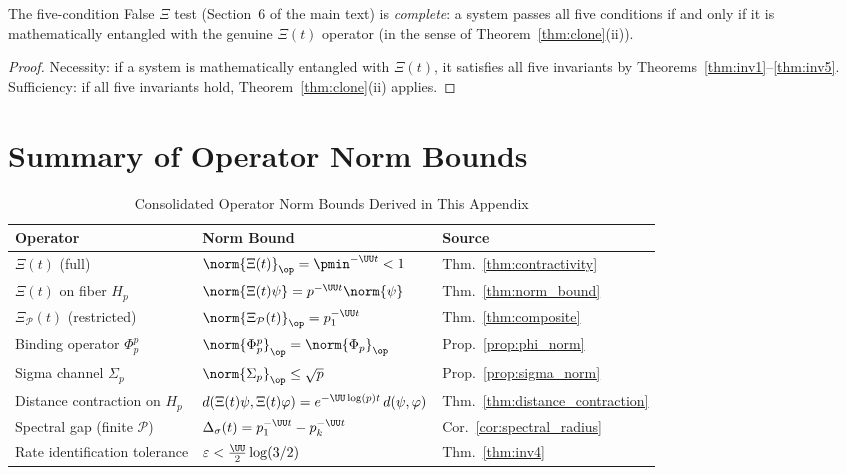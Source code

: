 \documentclass[12pt,letterpaper]{article}
\theoremstyle{definition}
\theoremstyle{remark}
\begin{document}
\begin{corollary}
\label{cor:false_xi_complete}
The five-condition False $\Xi$ test (Section~6 of the main text) is
\emph{complete}: a system passes all five conditions if and only if
it is mathematically entangled with the genuine $\Xi(t)$ operator
(in the sense of Theorem~\ref{thm:clone}(ii)).
\end{corollary}

\begin{proof}
Necessity: if a system is mathematically entangled with $\Xi(t)$, it satisfies
all five invariants by Theorems~\ref{thm:inv1}--\ref{thm:inv5}.
Sufficiency: if all five invariants hold, Theorem~\ref{thm:clone}(ii) applies.
\end{proof}

\section*{Summary of Operator Norm Bounds}
\label{sec:summary}

\begin{table}[H]
\centering
\renewcommand{\arraystretch}{1.45}
\caption{Consolidated Operator Norm Bounds Derived in This Appendix}
\begin{tabular}{p{3.8cm} p{5.2cm} p{3.4cm}}
\toprule
\textbf{Operator} & \textbf{Norm Bound} & \textbf{Source} \\
\midrule
$\Xi(t)$ (full) &
  $\norm{\Xi(t)}_\op = \pmin^{-\UU t} < 1$ &
  Thm.~\ref{thm:contractivity} \\
$\Xi(t)$ on fiber $H_p$ &
  $\norm{\Xi(t)\psi} = p^{-\UU t}\norm{\psi}$ &
  Thm.~\ref{thm:norm_bound} \\
$\Xi_\mathcal{P}(t)$ (restricted) &
  $\norm{\Xi_\mathcal{P}(t)}_\op = p_1^{-\UU t}$ &
  Thm.~\ref{thm:composite} \\
Binding operator $\Phi_p^p$ &
  $\norm{\Phi_p^p}_\op = \norm{\Phi_p}_\op$ &
  Prop.~\ref{prop:phi_norm} \\
Sigma channel $\Sigma_p$ &
  $\norm{\Sigma_p}_\op \leq \sqrt{p}$ &
  Prop.~\ref{prop:sigma_norm} \\
Distance contraction on $H_p$ &
  $d(\Xi(t)\psi,\Xi(t)\varphi) = e^{-\UU\log(p)t}\,d(\psi,\varphi)$ &
  Thm.~\ref{thm:distance_contraction} \\
Spectral gap (finite $\mathcal{P}$) &
  $\Delta_\sigma(t) = p_1^{-\UU t} - p_k^{-\UU t}$ &
  Cor.~\ref{cor:spectral_radius} \\
Rate identification tolerance &
  $\varepsilon < \tfrac{\UU}{2}\log(3/2)$ &
  Thm.~\ref{thm:inv4} \\
\bottomrule
\end{tabular}
\end{table}
\end{document}
